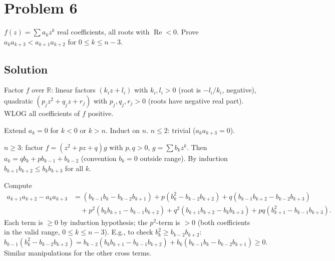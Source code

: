 \documentclass{article}
\begin{document}
\section*{Problem 6}
$f(z) = \sum a_k z^k$ real coefficients, all roots with $\operatorname{Re} < 0$. Prove $a_k a_{k+3} < a_{k+1} a_{k+2}$ for $0 \le k \le n - 3$.

\subsection*{Solution}
Factor $f$ over $\mathbb{R}$: linear factors $(k_i z + l_i)$ with $k_i, l_i > 0$ (root is $-l_i/k_i$, negative), quadratic $(p_j z^2 + q_j z + r_j)$ with $p_j, q_j, r_j > 0$ (roots have negative real part). WLOG all coefficients of $f$ positive.

Extend $a_k = 0$ for $k < 0$ or $k > n$. Induct on $n$. $n \le 2$: trivial ($a_k a_{k+3} = 0$).

$n \ge 3$: factor $f = (z^2 + pz + q) g$ with $p, q > 0$, $g = \sum b_k z^k$. Then $a_k = q b_k + p b_{k-1} + b_{k-2}$ (convention $b_k = 0$ outside range). By induction $b_{k+1} b_{k+2} \le b_k b_{k+3}$ for all $k$.

Compute
\begin{align*}
a_{k+1} a_{k+2} - a_k a_{k+3} &= (b_{k-1} b_k - b_{k-2} b_{k+1}) + p(b_k^2 - b_{k-2} b_{k+2}) + q(b_{k-1} b_{k+2} - b_{k-2} b_{k+3}) \\
&\quad + p^2(b_k b_{k+1} - b_{k-1} b_{k+2}) + q^2(b_{k+1} b_{k+2} - b_k b_{k+3}) + pq(b_{k+1}^2 - b_{k-1} b_{k+3}).
\end{align*}
Each term is $\ge 0$ by induction hypothesis; the $p^2$-term is $> 0$ (both coefficients in the valid range, $0 \le k \le n - 3$). E.g., to check $b_k^2 \ge b_{k-2} b_{k+2}$:
\[
b_{k-1}(b_k^2 - b_{k-2} b_{k+2}) = b_{k-2}(b_k b_{k+1} - b_{k-1} b_{k+2}) + b_k(b_{k-1} b_k - b_{k-2} b_{k+1}) \ge 0.
\]
Similar manipulations for the other cross terms.
\end{document}
